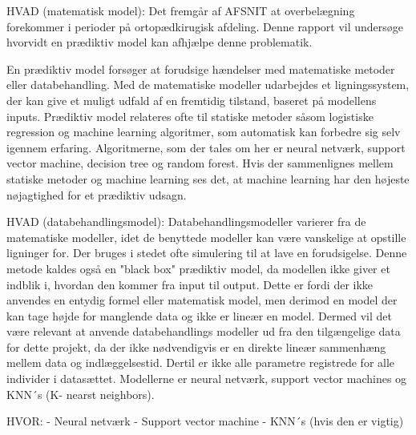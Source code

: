 %
HVAD (matematisk model):
Det fremgår af AFSNIT at overbelægning forekommer i perioder på ortopædkirugisk afdeling. Denne rapport vil undersøge hvorvidt en prædiktiv model kan afhjælpe denne problematik. 

En prædiktiv model forsøger at forudsige hændelser med matematiske metoder eller databehandling. Med de matematiske modeller udarbejdes et ligningssystem, der kan give et muligt udfald af en fremtidig tilstand, baseret på modellens inputs. Prædiktiv model relateres ofte til statiske metoder såsom logistiske regression og machine learning algoritmer, som automatisk kan forbedre sig selv igennem erfaring. Algoritmerne, som der tales om her er neural netværk, support vector machine, decision tree og random forest. Hvis der sammenlignes mellem statiske metoder og machine learning ses det, at machine learning har den højeste nøjagtighed for et prædiktiv udsagn. \cite{Luo2016} 





HVAD (databehandlingsmodel):
Databehandlingsmodeller varierer fra de matematiske modeller, idet de benyttede modeller kan være vanskelige at opstille ligninger for. Der bruges i stedet ofte simulering til at lave en forudsigelse. Denne metode kaldes også en "black box" prædiktiv model, da modellen ikke giver et indblik i, hvordan den kommer fra input til output. Dette er fordi der ikke anvendes en entydig formel eller matematisk model, men derimod en model der kan tage højde for manglende data og ikke er lineær en model. Dermed vil det være relevant at anvende databehandlings modeller ud fra den tilgængelige data for dette projekt, da der ikke nødvendigvis er en direkte lineær sammenhæng mellem data og indlæggelsestid. Dertil er ikke alle parametre registrede for alle individer i datasættet.
Modellerne er neural netværk, support vector machines og KNN´s (K- nearst neighbors).

HVOR: 
- Neural netværk
- Support vector machine 
- KNN´s (hvis den er vigtig)


